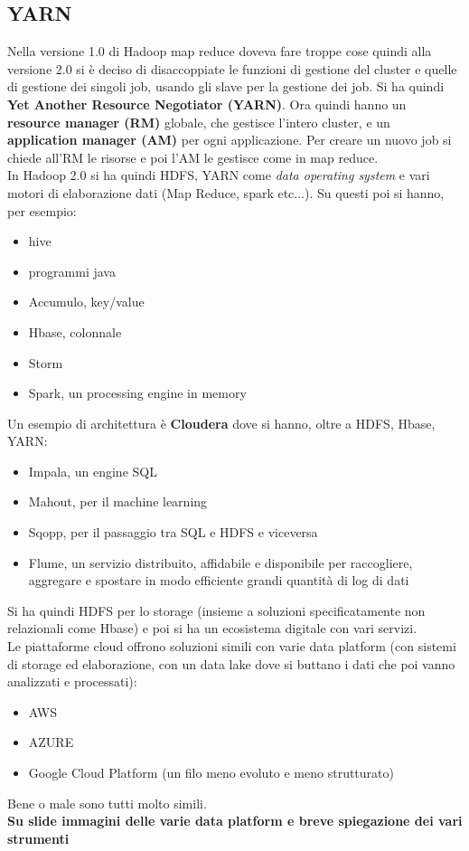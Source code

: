 \documentclass[a4paper,12pt, oneside]{book}
\begin{document}
\subsection{YARN}
Nella versione 1.0 di Hadoop map reduce doveva fare troppe cose quindi alla
versione 2.0 si è deciso di disaccoppiate le funzioni di gestione del cluster e
quelle di gestione dei singoli job, usando gli slave per la gestione dei job. Si
ha quindi \textbf{Yet Another Resource Negotiator (YARN)}. Ora quindi hanno un
\textbf{resource manager (RM)} globale, che gestisce l'intero cluster, e un
\textbf{application manager (AM)} per ogni applicazione. Per creare un nuovo job
si chiede all'RM le risorse e poi l'AM le gestisce come in map reduce.\\
In Hadoop 2.0 si ha quindi HDFS, YARN come \textit{data operating system} e
vari motori di elaborazione dati (Map Reduce, spark etc$\ldots$). Su questi poi
si hanno, per esempio:
\begin{itemize}
  \item hive
  \item programmi java
  \item Accumulo, key/value
  \item Hbase, colonnale
  \item Storm
  \item Spark, un processing engine in memory
\end{itemize}
Un esempio di architettura è \textbf{Cloudera} dove si hanno, oltre a HDFS,
Hbase, YARN:
\begin{itemize}
  \item Impala, un engine SQL
  \item Mahout, per il machine learning
  \item Sqopp, per il passaggio tra SQL e HDFS e viceversa
  \item Flume, un servizio distribuito, affidabile e disponibile per
  raccogliere, aggregare e spostare in modo efficiente grandi quantità di log di
  dati 
\end{itemize}
Si ha quindi HDFS per lo storage (insieme a soluzioni specificatamente non
relazionali come Hbase) e poi si ha un ecosistema digitale con vari servizi.\\
Le piattaforme cloud offrono soluzioni simili con varie data platform (con
sistemi di storage ed elaborazione, con un data lake dove si buttano i dati che
poi vanno analizzati e processati):
\begin{itemize}
  \item AWS
  \item AZURE
  \item Google Cloud Platform (un filo meno evoluto e meno strutturato)
\end{itemize}
Bene o male sono tutti molto simili.\\
\textbf{Su slide immagini delle varie data platform e breve spiegazione dei vari
  strumenti}
\end{document}
